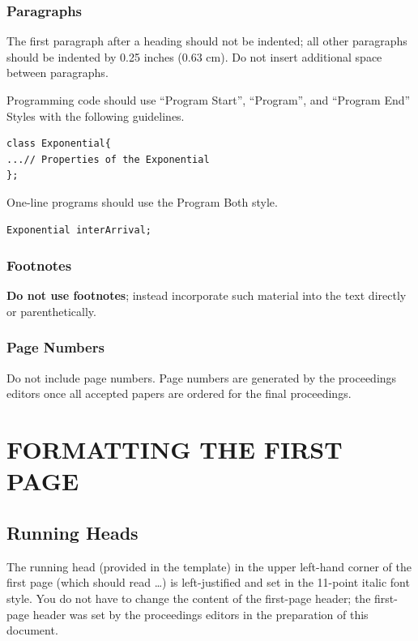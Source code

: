 \documentclass{article}
\begin{document}
\subsubsection{Paragraphs}
The first paragraph after a heading should not be indented; all other paragraphs should be indented by 0.25 inches (0.63 cm). Do not insert additional space between paragraphs.

Programming code should use ``Program Start'', ``Program'', and ``Program End'' Styles with the following guidelines.

\begin{verbatim}
class Exponential{
...// Properties of the Exponential
};
\end{verbatim}

One-line programs should use the  Program Both  style.

\begin{verbatim}
Exponential interArrival;
\end{verbatim}

\subsubsection{Footnotes}
\textbf{Do not use footnotes}; instead incorporate such material into the text directly or parenthetically.

\subsubsection{Page Numbers}
Do not include page numbers. Page numbers are generated by the proceedings editors once all accepted papers are ordered for the final proceedings.

\section{FORMATTING THE FIRST PAGE}

\subsection{Running Heads}
The running head (provided in the template) in the upper left-hand corner of the first page (which should read {\em \currentCaption}\dots) is left-justified and set in the 11-point italic font style. You do not have to change the content of the first-page header; the first-page header was set by the proceedings editors in the preparation of this document.
\end{document}
